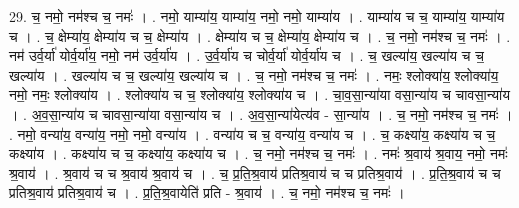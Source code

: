 \documentclass[17pt]{extarticle}
\begin{document}
29. च॒ नमो॒ नम॑श्च च॒ नमः॑ । . नमो॒ याम्या॑य॒ याम्या॑य॒ नमो॒ नमो॒ याम्या॑य । . याम्या॑य च च॒ याम्या॑य॒ याम्या॑य च । . च॒ क्षेम्या॑य॒ क्षेम्या॑य च च॒ क्षेम्या॑य । . क्षेम्या॑य च च॒ क्षेम्या॑य॒ क्षेम्या॑य च । . च॒ नमो॒ नम॑श्च च॒ नमः॑ । . नम॑ उर्व॒र्या॑ योर्व॒र्या॑य॒ नमो॒ नम॑ उर्व॒र्या॑य । . उ॒र्व॒र्या॑य च चोर्व॒र्या॑ योर्व॒र्या॑य च । . च॒ खल्या॑य॒ खल्या॑य च च॒ खल्या॑य । . खल्या॑य च च॒ खल्या॑य॒ खल्या॑य च । . च॒ नमो॒ नम॑श्च च॒ नमः॑ । . नमः॒ श्लोक्या॑य॒ श्लोक्या॑य॒ नमो॒ नमः॒ श्लोक्या॑य । . श्लोक्या॑य च च॒ श्लोक्या॑य॒ श्लोक्या॑य च । . चा॒व॒सा॒न्या॑या वसा॒न्या॑य च चावसा॒न्या॑य । . अ॒व॒सा॒न्या॑य च चावसा॒न्या॑या वसा॒न्या॑य च । . अ॒व॒सा॒न्या॑येत्य॑व - सा॒न्या॑य । . च॒ नमो॒ नम॑श्च च॒ नमः॑ । . नमो॒ वन्या॑य॒ वन्या॑य॒ नमो॒ नमो॒ वन्या॑य । . वन्या॑य च च॒ वन्या॑य॒ वन्या॑य च । . च॒ कक्ष्या॑य॒ कक्ष्या॑य च च॒ कक्ष्या॑य । . कक्ष्या॑य च च॒ कक्ष्या॑य॒ कक्ष्या॑य च । . च॒ नमो॒ नम॑श्च च॒ नमः॑ । . नमः॑ श्र॒वाय॑ श्र॒वाय॒ नमो॒ नमः॑ श्र॒वाय॑ । . श्र॒वाय॑ च च श्र॒वाय॑ श्र॒वाय॑ च । . च॒ प्र॒ति॒श्र॒वाय॑ प्रतिश्र॒वाय॑ च च प्रतिश्र॒वाय॑ । . प्र॒ति॒श्र॒वाय॑ च च प्रतिश्र॒वाय॑ प्रतिश्र॒वाय॑ च । . प्र॒ति॒श्र॒वायेति॑ प्रति - श्र॒वाय॑ । . च॒ नमो॒ नम॑श्च च॒ नमः॑ । \newline
\end{document}
